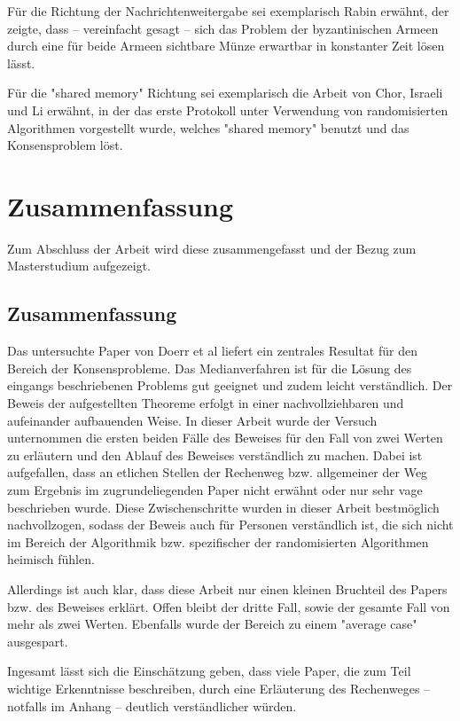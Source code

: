 \documentclass[12pt,ngerman,a4paper]{scrartcl}
\theoremstyle{plain}
\theoremstyle{definition}
\theoremstyle{remark}
\begin{document}
Für die Richtung der Nachrichtenweitergabe sei exemplarisch Rabin\cite{Rabin1983}
erwähnt, der zeigte,
dass -- vereinfacht gesagt -- sich das Problem der byzantinischen Armeen durch
eine für beide Armeen sichtbare Münze erwartbar in konstanter Zeit lösen lässt.

Für die "shared memory" Richtung sei exemplarisch die Arbeit von Chor, Israeli
und Li\cite{Chor1994} erwähnt, in der das erste Protokoll unter Verwendung von
randomisierten Algorithmen vorgestellt wurde, welches "shared memory" benutzt
und das Konsensproblem löst.

\section{Zusammenfassung}

Zum Abschluss der Arbeit wird diese zusammengefasst und der Bezug zum
Masterstudium aufgezeigt.

\subsection{Zusammenfassung}

Das untersuchte Paper von Doerr et al\cite{Doerr2011} liefert ein zentrales
Resultat für den Bereich der Konsensprobleme. Das Medianverfahren ist für die
Lösung des eingangs beschriebenen Problems gut geeignet und zudem leicht
verständlich. Der Beweis der aufgestellten Theoreme erfolgt in einer
nachvollziehbaren und aufeinander aufbauenden Weise. In dieser Arbeit wurde
der Versuch unternommen die ersten beiden Fälle des Beweises für den Fall von zwei
Werten zu erläutern und den Ablauf des Beweises verständlich zu machen. Dabei ist
aufgefallen, dass an etlichen Stellen der Rechenweg bzw. allgemeiner der Weg
zum Ergebnis im zugrundeliegenden Paper nicht erwähnt oder nur sehr vage
beschrieben wurde. Diese Zwischenschritte wurden in dieser Arbeit bestmöglich
nachvollzogen, sodass der Beweis auch für Personen verständlich ist, die sich
nicht im Bereich der Algorithmik bzw. spezifischer der randomisierten Algorithmen
heimisch fühlen.

Allerdings ist auch klar, dass diese Arbeit nur einen kleinen Bruchteil des Papers
bzw. des Beweises erklärt. Offen bleibt der dritte Fall, sowie der gesamte Fall
von mehr als zwei Werten. Ebenfalls wurde der Bereich zu einem "average case"
ausgespart.

Ingesamt lässt sich die Einschätzung geben, dass viele Paper, die zum Teil
wichtige Erkenntnisse beschreiben, durch eine Erläuterung des Rechenweges --
notfalls im Anhang -- deutlich verständlicher würden.
\end{document}
